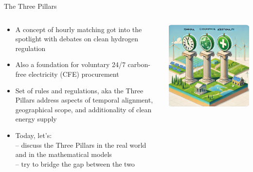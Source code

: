 \begin{frame}{The Three Pillars}

  \begin{columns}
  	\begin{column}{0.6\textwidth}
  		 \begin{itemize}
  			\item A concept of \alert{hourly matching} got into the spotlight with debates on clean hydrogen regulation
        \item Also a foundation for voluntary 24/7 carbon-free electricity (CFE) procurement  
  			\item Set of rules and regulations, aka \alert{the Three Pillars} address aspects of temporal alignment, geographical scope, and additionality of clean energy supply
  			\item Today, let's: \\
        -- discuss the Three Pillars in the real world and in the mathematical models\\
        -- try to bridge the gap between the two
        \end{itemize}        
  	\end{column}
  \begin{column}{0.4\textwidth}
  		\includegraphics[width=1\linewidth]{images/3pillars}  
  \end{column}
  \end{columns}

\end{frame}



